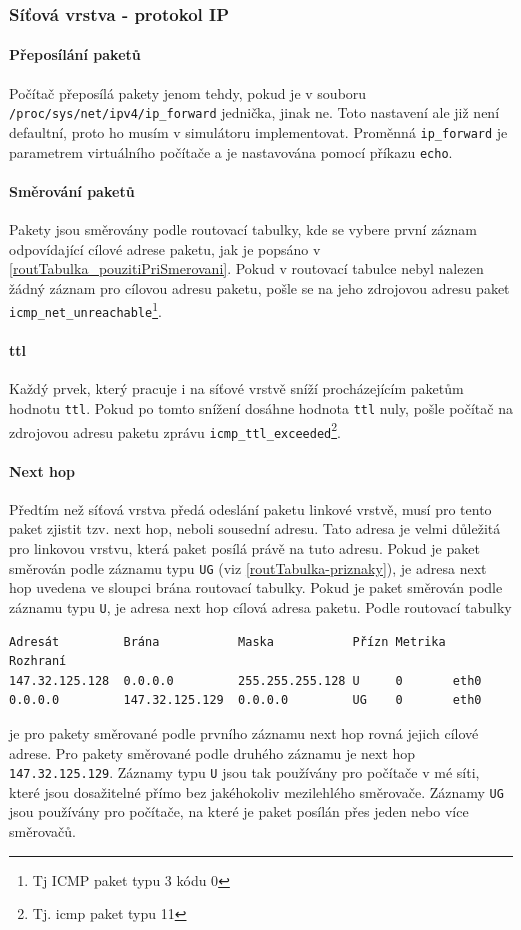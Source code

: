 \subsubsection{Síťová vrstva - protokol IP}

\paragraph{Přeposílání paketů}
Počítač přeposílá pakety jenom tehdy, pokud je v souboru \verb|/proc/sys/net/ipv4/ip_forward| jednička, jinak ne. Toto nastavení ale již není defaultní, proto ho musím v simulátoru implementovat. Proměnná \verb|ip_forward| je parametrem virtuálního počítače a je nastavována pomocí příkazu \verb|echo|.
\paragraph{Směrování paketů}
Pakety jsou směrovány podle routovací tabulky, kde se vybere první záznam odpovídající cílové adrese paketu, jak je popsáno v \ref{routTabulka_pouzitiPriSmerovani}. Pokud v routovací tabulce nebyl nalezen žádný záznam pro cílovou adresu paketu, pošle se na jeho zdrojovou adresu paket \verb|icmp_net_unreachable|\footnote{Tj ICMP paket typu 3 kódu 0}.
\paragraph{ttl}
Každý prvek, který pracuje i na síťové vrstvě sníží procházejícím paketům hodnotu \verb|ttl|. Pokud po tomto snížení dosáhne hodnota \verb|ttl| nuly, pošle počítač na zdrojovou adresu paketu zprávu \verb|icmp_ttl_exceeded|\footnote{Tj. icmp paket typu 11}.
\paragraph{Next hop}
Předtím než síťová vrstva předá odeslání paketu linkové vrstvě, musí pro tento paket zjistit tzv. next hop, neboli sousední adresu. \cite{next_hop} Tato adresa je velmi důležitá pro linkovou vrstvu, která paket posílá právě na tuto adresu. Pokud je paket směrován podle záznamu typu \verb|UG| (viz \ref{routTabulka-priznaky}), je adresa next hop uvedena ve sloupci brána routovací tabulky. Pokud je paket směrován podle záznamu typu \verb|U|, je adresa next hop cílová adresa paketu. Podle routovací tabulky
\begin{verbatim}
Adresát         Brána           Maska           Přízn Metrika  Rozhraní
147.32.125.128  0.0.0.0         255.255.255.128 U     0       eth0
0.0.0.0         147.32.125.129  0.0.0.0         UG    0       eth0
\end{verbatim}
je pro pakety směrované podle prvního záznamu next hop rovná jejich cílové adrese. Pro pakety směrované podle druhého záznamu je next hop \verb|147.32.125.129|. Záznamy typu \verb|U| jsou tak používány pro počítače v mé síti, které jsou dosažitelné přímo bez jakéhokoliv mezilehlého směrovače. Záznamy \verb|UG| jsou používány pro počítače, na které je paket posílán přes jeden nebo více směrovačů.

